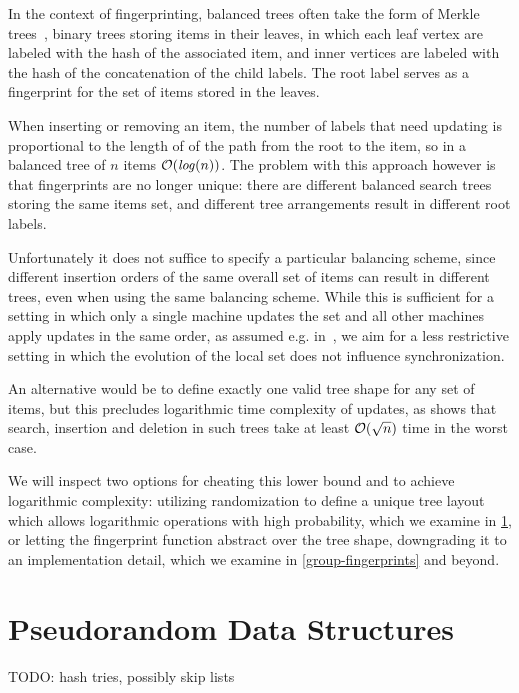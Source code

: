 In the context of fingerprinting, balanced trees often take the form of Merkle trees~\cite{merkle1989certified}, binary trees storing items in their leaves, in which each leaf vertex are labeled with the hash of the associated item, and inner vertices are labeled with the hash of the concatenation of the child labels. The root label serves as a fingerprint for the set of items stored in the leaves.

When inserting or removing an item, the number of labels that need updating is proportional to the length of of the path from the root to the item, so in a balanced tree of $n$ items $\mathcal{O}(\mathit{log}(n))$. The problem with this approach however is that fingerprints are no longer unique: there are different balanced search trees storing the same items set, and different tree arrangements result in different root labels.

Unfortunately it does not suffice to specify a particular balancing scheme, since different insertion orders of the same overall set of items can result in different trees, even when using the same balancing scheme. While this is sufficient for a setting in which only a single machine updates the set and all other machines apply updates in the same order, as assumed e.g. in~\cite{nissim1998certificate}, we aim for a less restrictive setting in which the evolution of the local set does not influence synchronization.

An alternative would be to define exactly one valid tree shape for any set of items, but this precludes logarithmic time complexity of updates, as \cite{uniquerepresentation} shows that search, insertion and deletion in such trees take at least $\mathcal{O}(\sqrt{n})$ time in the worst case.

We will inspect two options for cheating this lower bound and to achieve logarithmic complexity: utilizing randomization to define a unique tree layout which allows logarithmic operations with high probability, which we examine in \cref{randomization}, or letting the fingerprint function abstract over the tree shape, downgrading it to an implementation detail, which we examine in \cref{group-fingerprints} and beyond.

\section{Pseudorandom Data Structures}
\label{randomization}

TODO: hash tries, possibly skip lists

